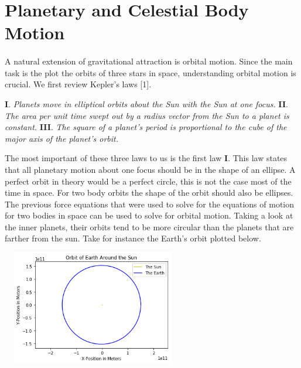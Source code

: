 \documentclass[]{article}
\begin{document}
\section{Planetary and Celestial Body Motion}
\begin{multicols}{2}
\paragraph{}
\setlength{\parskip}{1em}
A natural extension of gravitational attraction is orbital motion. Since the main task is the plot the orbits of three stars in space, understanding orbital motion is crucial. We first review Kepler's laws [1].
\begin{center}
\textbf{I}. \small{\textit{Planets move in elliptical orbits about the Sun with the Sun at one focus.}} \newline
\textbf{II}. \small{\textit{The area per unit time swept out by a radius vector from the Sun to a planet is constant.}} \newline
\textbf{III}. \small{\textit{The square of a planet's period is proportional to the cube of the major axis of the planet's orbit.}} \newline
\end{center}
The most important of these three laws to us is the first law \textbf{I}. This law states that all planetary motion about one focus should be in the shape of an ellipse. A perfect orbit in theory would be a perfect circle, this is not the case most of the time in space. For two body orbits the shape of the orbit should also be ellipses. The previous force equations that were used to solve for the equations of motion for two bodies in space can be used to solve for orbital motion. Taking a look at the inner planets, their orbits tend to be more circular than the planets that are farther from the sun. Take for instance the Earth's orbit plotted below. 
\begin{center}
\includegraphics[width=8cm, height=5.0cm]{PHYS 342 FP Earth Orbit.png} 

\end{center}
\end{multicols}
\end{document}
